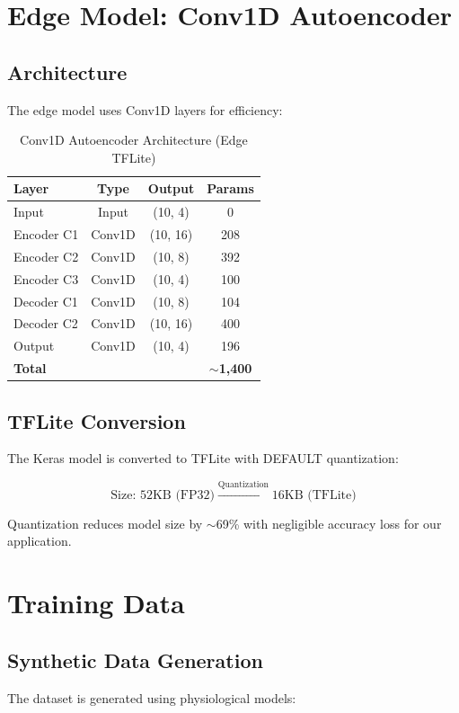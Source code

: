 \documentclass[conference]{IEEEtran}
\begin{document}
\section{Edge Model: Conv1D Autoencoder}

\subsection{Architecture}
The edge model uses Conv1D layers for efficiency:

\begin{table}[H]
\centering
\caption{Conv1D Autoencoder Architecture (Edge TFLite)}
\label{tab:conv1d_arch}
\begin{tabular}{lccc}
\toprule
\textbf{Layer} & \textbf{Type} & \textbf{Output} & \textbf{Params} \\
\midrule
Input & Input & (10, 4) & 0 \\
Encoder C1 & Conv1D & (10, 16) & 208 \\
Encoder C2 & Conv1D & (10, 8) & 392 \\
Encoder C3 & Conv1D & (10, 4) & 100 \\
\midrule
Decoder C1 & Conv1D & (10, 8) & 104 \\
Decoder C2 & Conv1D & (10, 16) & 400 \\
Output & Conv1D & (10, 4) & 196 \\
\midrule
\textbf{Total} & & & \textbf{$\sim$1,400} \\
\bottomrule
\end{tabular}
\end{table}

\subsection{TFLite Conversion}
The Keras model is converted to TFLite with DEFAULT quantization:

\begin{equation}
\text{Size: } 52\text{KB (FP32)} \xrightarrow{\text{Quantization}} 16\text{KB (TFLite)}
\end{equation}

Quantization reduces model size by $\sim$69\% with negligible accuracy loss for our application.

\section{Training Data}

\subsection{Synthetic Data Generation}
The dataset is generated using physiological models:
\end{document}
